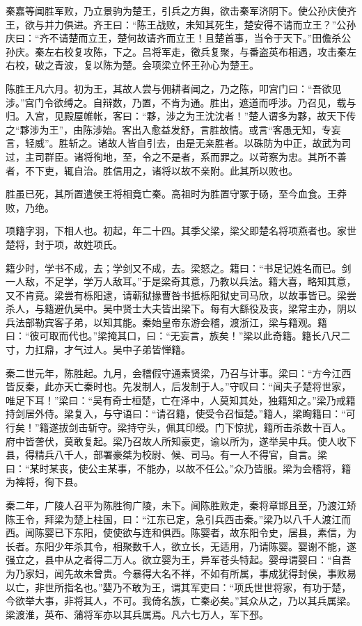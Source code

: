 \documentclass[12pt,UTF8]{ctexbook}
\begin{document}
秦嘉等闻胜军败，乃立景驹为楚王，引兵之方舆，欲击秦军济阴下。使公孙庆使齐王，欲与并力俱进。齐王曰：“陈王战败，未知其死生，楚安得不请而立王？”公孙庆曰：“齐不请楚而立王，楚何故请齐而立王！且楚首事，当令于天下。”田儋杀公孙庆。秦左右校复攻陈，下之。吕将军走，徼兵复聚，与番盗英布相遇，攻击秦左右校，破之青波，复以陈为楚。会项梁立怀王孙心为楚王。



陈胜王凡六月。初为王，其故人尝与佣耕者闻之，乃之陈，叩宫门曰：“吾欲见涉。”宫门令欲缚之。自辩数，乃置，不肯为通。胜出，遮道而呼涉。乃召见，载与归。入宫，见殿屋帷帐，客曰：“夥，涉之为王沈沈者！”楚人谓多为夥，故天下传之“夥涉为王”，由陈涉始。客出入愈益发舒，言胜故情。或言“客愚无知，专妄言，轻威”。胜斩之。诸故人皆自引去，由是无亲胜者。以硃防为中正，故武为司过，主司群臣。诸将徇地，至，令之不是者，系而罪之。以苛察为忠。其所不善者，不下吏，辄自治。胜信用之，诸将以故不亲附。此其所以败也。



胜虽已死，其所置遣侯王将相竟亡秦。高祖时为胜置守冢于砀，至今血食。王莽败，乃绝。



项籍字羽，下相人也。初起，年二十四。其季父梁，梁父即楚名将项燕者也。家世楚将，封于项，故姓项氏。



籍少时，学书不成，去；学剑又不成，去。梁怒之。籍曰：“书足记姓名而已。剑一人敌，不足学，学万人敌耳。”于是梁奇其意，乃教以兵法。籍大喜，略知其意，又不肯竟。梁尝有栎阳逮，请蕲狱掾曹咎书抵栎阳狱史司马欣，以故事皆已。梁尝杀人，与籍避仇吴中。吴中贤士大夫皆出梁下。每有大繇役及丧，梁常主办，阴以兵法部勒宾客子弟，以知其能。秦始皇帝东游会稽，渡浙江，梁与籍观。籍曰：“彼可取而代也。”梁掩其口，曰：“无妄言，族矣！”梁以此奇籍。籍长八尺二寸，力扛鼎，才气过人。吴中子弟皆惮籍。



秦二世元年，陈胜起。九月，会稽假守通素贤梁，乃召与计事。梁曰：“方今江西皆反秦，此亦天亡秦时也。先发制人，后发制于人。”守叹曰：“闻夫子楚将世家，唯足下耳！”梁曰：“吴有奇士桓楚，亡在泽中，人莫知其处，独籍知之。”梁乃戒籍持剑居外侍。梁复入，与守语曰：“请召籍，使受令召恒楚。”籍人，梁眴籍曰：“可行矣！”籍遂拔剑击斩守。梁持守头，佩其印绶。门下惊扰，籍所击杀数十百人。府中皆詟伏，莫敢复起。梁乃召故人所知豪吏，谕以所为，遂举吴中兵。使人收下县，得精兵八千人，部署豪桀为校尉、候、司马。有一人不得官，自言。梁曰：“某时某丧，使公主某事，不能办，以故不任公。”众乃皆服。梁为会稽将，籍为裨将，徇下县。



秦二年，广陵人召平为陈胜徇广陵，未下。闻陈胜败走，秦将章邯且至，乃渡江矫陈王令，拜梁为楚上柱国，曰：“江东已定，急引兵西击秦。”梁乃以八千人渡江而西。闻陈婴已下东阳，使使欲与连和俱西。陈婴者，故东阳令史，居县，素信，为长者。东阳少年杀其令，相聚数千人，欲立长，无适用，乃请陈婴。婴谢不能，遂强立之，县中从之者得二万人。欲立婴为王，异军苍头特起。婴母谓婴曰：“自吾为乃家妇，闻先故未曾贵。今暴得大名不祥，不如有所属，事成犹得封侯，事败易以亡，非世所指名也。”婴乃不敢为王，谓其军吏曰：“项氏世世将家，有功于楚，今欲举大事，非将其人，不可。我倚名族，亡秦必矣。”其众从之，乃以其兵属梁。梁渡淮，英布、蒲将军亦以其兵属焉。凡六七万人，军下邳。
\end{document}
